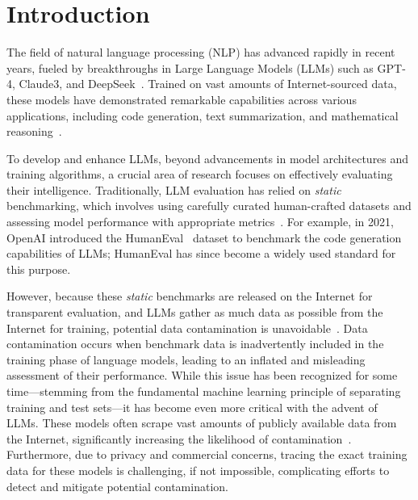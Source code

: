 

\section{Introduction}


The field of natural language processing (NLP) has advanced rapidly in recent years, fueled by breakthroughs in Large Language Models (LLMs) such as GPT-4, Claude3, and DeepSeek~\cite{achiam2023gpt, liu2024deepseek, wan2023efficient}. Trained on vast amounts of Internet-sourced data, these models have demonstrated remarkable capabilities across various applications, including code generation, text summarization, and mathematical reasoning~\cite{codeforces, hu-etal-2024-reasoning}.

To develop and enhance LLMs, beyond advancements in model architectures and training algorithms, a crucial area of research focuses on effectively evaluating their intelligence. Traditionally, LLM evaluation has relied on \textit{static} benchmarking, which involves using carefully curated human-crafted datasets and assessing model performance with appropriate metrics~\cite{wang2018glue, achiam2023gpt, gunasekar2023textbooks}. 
For example, in 2021, OpenAI introduced the HumanEval~\cite{chen2021evaluating} dataset to benchmark the code generation capabilities of LLMs; HumanEval has since become a widely used standard for this purpose.


However, because these \textit{static} benchmarks are released on the Internet for transparent evaluation, and LLMs gather as much data as possible from the Internet for training, potential data contamination is unavoidable~\cite{magar2022data, deng2024investigating, li2024open, conda-2024-data, balloccu-etal-2024-leak}. Data contamination occurs when benchmark data is inadvertently included in the training phase of language models, leading to an inflated and misleading assessment of their performance. While this issue has been recognized for some time—stemming from the fundamental machine learning principle of separating training and test sets—it has become even more critical with the advent of LLMs. These models often scrape vast amounts of publicly available data from the Internet, significantly increasing the likelihood of contamination~\cite{achiam2023gpt, liu2024deepseek}. Furthermore, due to privacy and commercial concerns, tracing the exact training data for these models is challenging, if not impossible, complicating efforts to detect and mitigate potential contamination.


